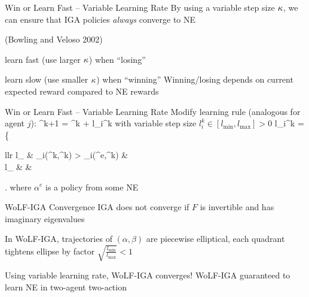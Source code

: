 \begin{frame}{Win or Learn Fast -- Variable Learning Rate}
    By using a variable step size $\kappa$, we can ensure that IGA policies {\it always} converge to NE

    \vspace{5pt}

     (Bowling and Veloso 2002)
    \blist
        \item learn fast (use larger $\kappa$) when ``losing''
        \item learn slow (use smaller $\kappa$) when ``winning''
    \elist
    Winning/losing depends on current expected reward compared to NE rewards
\end{frame}

\begin{frame}{Win or Learn Fast -- Variable Learning Rate}
    Modify learning rule (analogous for agent $j$):
    \bmath
	\alpha^{k+1} = \alpha^k + l_i^k \step  {}
    \emath
    with variable step size $l_i^k \in [l_{\min},l_{\max}] > 0$
    \bmath
	l_i^k = \left\{
		\begin{array}{llr}
			l_{\min} &  \exret_i(\alpha^k,\beta^k) > \exret_i(\alpha^e,\beta^k) &  \\
			l_{\max} &  & 
		\end{array}
		\right.
    \emath
    where $\alpha^e$ is a policy from some NE
\end{frame}

\begin{frame}{WoLF-IGA Convergence}
    \bcol
            IGA does not converge if $F$ is invertible and has imaginary eigenvalues \\[3pt]
            \blist
                \item In WoLF-IGA, trajectories of $(\alpha,\beta)$ are piecewise elliptical, each quadrant tightens ellipse by factor $\sqrt{\frac{l_{\min}}{l_{\max}}} < 1$
                \item Using variable learning rate, WoLF-IGA converges!
            \elist
            WoLF-IGA guaranteed to learn NE in two-agent two-action \nfg
    \ecol
\end{frame}

